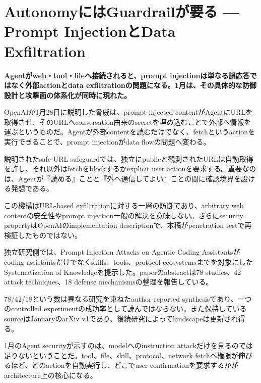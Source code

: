 \section{AutonomyにはGuardrailが要る — Prompt InjectionとData Exfiltration}
\noindent\textbf{Agentがweb・tool・fileへ接続されると、prompt injectionは単なる誤応答ではなく外部actionとdata exfiltrationの問題になる。1月は、その具体的な防御設計と攻撃面の体系化が同時に現れた。}\autocite{src-0d2abbb0fa62,src-e9010a7fe30b}

OpenAIが1月28日に説明した脅威は、prompt-injected contentがAgentにURLを取得させ、そのURLへconversation由来のsecretを埋め込むことで外部へ情報を運ぶというものだ。Agentが外部contentを読むだけでなく、fetchというactionを実行できることで、prompt injectionがdata flowの問題へ変わる。\autocite{src-0d2abbb0fa62}


説明されたsafe-URL safeguardでは、独立にpublicと観測されたURLは自動取得を許し、それ以外はfetchをblockするかexplicit user actionを要求する。重要なのは、Agentが『読める』ことと『外へ通信してよい』ことの間に確認境界を設ける発想である。\autocite{src-0d2abbb0fa62}


\begin{claimboundary}
この機構はURL-based exfiltrationに対する一層の防御であり、arbitrary web contentの安全性やprompt injection一般の解決を意味しない。さらにsecurity propertyはOpenAIのimplementation descriptionで、本稿がpenetration testで再検証したものではない。\autocite{src-0d2abbb0fa62}
\end{claimboundary}

独立研究側では、Prompt Injection Attacks on Agentic Coding Assistantsがcoding assistantsだけでなくskills、tools、protocol ecosystemsまでを対象にしたSystematization of Knowledgeを提示した。paperのabstractは78 studies、42 attack techniques、18 defense mechanismsの整理を報告している。\autocite{src-e9010a7fe30b}


\begin{claimboundary}
78/42/18という数は異なる研究を束ねたauthor-reported synthesisであり、一つのcontrolled experimentの成功率として読んではならない。また保持しているsourceはJanuaryのarXiv v1であり、後続研究によってlandscapeは更新され得る。\autocite{src-e9010a7fe30b}
\end{claimboundary}

1月のAgent securityが示すのは、modelへのinstruction attackだけを見るのでは足りないということだ。tool、file、skill、protocol、network fetchへ権限が伸びるほど、どのactionを自動実行し、どこでuser confirmationを要求するかがarchitecture上の核心になる。\autocite{src-0d2abbb0fa62,src-e9010a7fe30b}
